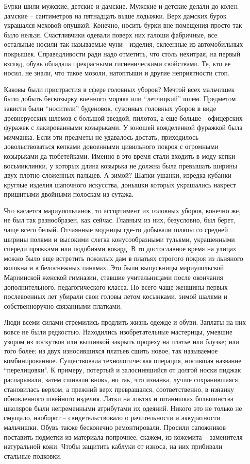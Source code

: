 Бурки шили мужские, детские и дамские. Мужские и детские делали до колен,
дамские – сантиметров на пятнадцать выше лодыжки. Верх дамских бурок украшался
меховой опушкой. Конечно, носить бурки вне помещения просто так было нельзя.
Счастливчики одевали поверх них галоши фабричные, все остальные носили так
называемые чуни - изделия, склеенные из автомобильных покрышек. Справедливости
ради надо отметить, что столь нехитрая, на первый взгляд, обувь обладала
прекрасными гигиеническими свойствами. Те, кто ее носил, не знали, что такое
мозоли, натоптыши и другие неприятности стоп.

Каковы были пристрастия в сфере головных уборов? Мечтой всех мальчишек было
добыть бескозырку военного моряка или \enquote{летчицкий} шлем. Предметом
зависти были \enquote{носители} буденовок, суконных головных уборов в виде
древнерусских шлемов с большой звездой, пилоток, а еще больше - офицерских
фуражек с лакированными козырьками. У юношей вожделенной фуражкой была
мичманка. Если эти предметы не удавалось достать, приходилось довольствоваться
кепками довоенными цивильного покроя с огромными козырьками да тюбетейками.
Именно в это время стали входить в моду кепки восьмиклинки, у которых длина
козырька не должна была превышать ширины двух плотно сложенных пальцев. А
зимой? Шапки-ушанки, изредка кубанки – круглые изделия шапочного искусства,
донышки которых украшались накрест пришитыми двойными полоскам из сутажа.

Что касается мариупольчанок, то ассортимент их головных уборов, конечно же, не
был так разнообразен, как сейчас. Главным из них, безусловно, был берет, чаще
всего белый. Отчаянные модницы где-то добывали шляпы со средней ширины полями и
высокими слегка конусообразными тульями, украшенными спереди пряжками или
подобиями кокард. В то достославное время на улицах можно было еще встретить
пожилых дам в платьях строгого покроя из льняного волокна и в белоснежных
панамах. Это были выпускницы мариупольской Мариинской женской гимназии, ставшие
учительницами после окончания дополнительного, педагогического класса. Но всего
чаще женщины первых послевоенных лет убирали свои головы летом косынками, зимой
шалями и собственноручно связанными платками.

Люди всеми силами стремились продлить жизнь одежде и обуви. Заплаты на них
вовсе не были редкостью. Находились изобретательные мастерицы, умевшие узором
из лоскутков или вышивкой закрыть прореху на платье или блузке; или того более:
из двух износившихся платьев сшить новое, так называемое комбинированное.
Существовала технологическая операция, носившая название \enquote{перелицовки}. К
примеру, потертый и залоснившийся от долгой носки пиджак распарывали, затем
сшивали вновь, но так, что изнанка, лучше сохранившаяся, становилась верхом, а
прежний верх превращался, соответственно, в изнанку обновленного швейного
изделия. Латки на локтях и штанишках большинства школяров были непременными
атрибутами их одеяний. Никого это не только не смущало, наоборот –
свидетельствовало о рачительности и аккуратности мальчишки. Обувь также
бесконечно ремонтировали. Просили сапожников поставить подметки из материала
попрочнее, скажем, из кожемита – заменителя натуральной кожи. Чтобы защитить
каблуки от износа, на них прибивали стальные подковки.

